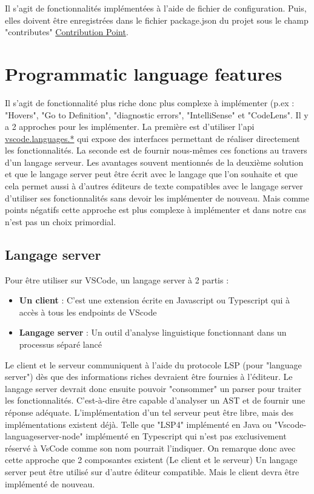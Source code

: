 \documentclass[
    iict, %
    il, %
]{heig-tb}
\begin{document}
Il s'agit de fonctionnalités implémentées à l'aide de fichier de configuration.
Puis, elles doivent être enregistrées dans le fichier package.json du projet sous le champ "contributes" \space \href{https://code.visualstudio.com/api/references/contribution-points}{ Contribution Point}.

\section{Programmatic language features}
Il s'agit de fonctionnalité plus riche donc plus complexe à implémenter (p.ex : "Hovers", "Go to Definition", "diagnostic errors", "IntelliSense" \space et "CodeLens".
Il y a 2 approches pour les implémenter.
La première est d'utiliser l'api \href{https://code.visualstudio.com/api/references/vscode-api#languages}{vscode.languages.*} qui expose des interfaces permettant de réaliser directement les fonctionnalités.
La seconde est de fournir nous-mêmes ces fonctions au travers d'un langage serveur.
Les avantages souvent mentionnés de la deuxième solution et que le langage server peut être écrit avec le langage que l'on souhaite et que cela permet aussi à d'autres éditeurs de texte compatibles avec le langage server d'utiliser ses fonctionnalités sans devoir les implémenter de nouveau. Mais comme points négatifs cette approche est plus complexe à implémenter et dans notre cas n'est pas un choix primordial.

\subsection{Langage server}
Pour être utiliser sur VSCode, un langage server à 2 partis :
\begin{itemize}
    \item \textbf{Un client} : C'est une extension écrite en Javascript ou Typescript qui à accès à tous les endpoints de VScode
    \item \textbf{Langage server} : Un outil d'analyse linguistique fonctionnant dans un processus séparé lancé
\end{itemize}

Le client et le serveur communiquent à l'aide du protocole LSP (pour "language server") dès que des informations riches devraient être fournies à l'éditeur.
Le langage server devrait donc ensuite pouvoir "consommer" un parser pour traiter les fonctionnalités. C'est-à-dire être capable d'analyser un AST et de fournir une réponse adéquate.
L'implémentation d'un tel serveur peut être libre, mais des implémentations existent déjà. Telle que "LSP4" implémenté en Java ou  "Vscode-languageserver-node" implémenté en Typescript qui n'est pas exclusivement réservé à VsCode comme son nom pourrait l'indiquer.
On remarque donc avec cette approche que 2 composantes existent (Le client et le serveur)
Un langage server peut être utilisé sur d'autre éditeur compatible. Mais le client devra être implémenté de nouveau.
\end{document}
